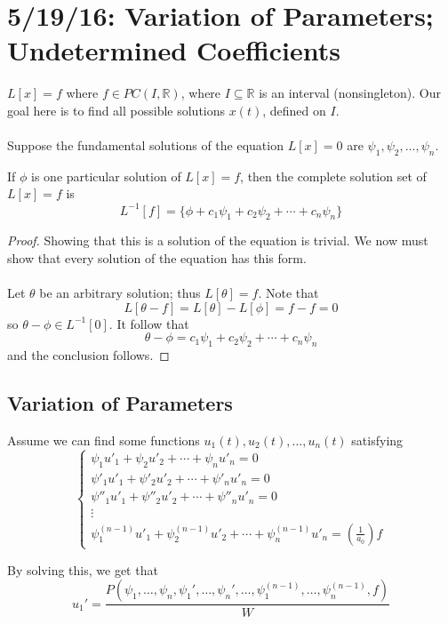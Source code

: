 \documentclass[12pt]{article}
\begin{document}
\section{5/19/16: Variation of Parameters; Undetermined Coefficients}

$L[x] = f$ where $f \in PC(I,\mathbb{R})$, where $I \subseteq \mathbb{R}$ is an interval (nonsingleton). Our goal here is to find all possible solutions $x(t)$, defined on $I$. \\ \\
Suppose the fundamental solutions of the equation $L[x] = 0$ are $\psi_1,\psi_2,\dots,\psi_n$.

\begin{theorem}
If $\phi$ is one particular solution of $L[x] = f$, then the complete solution set of $L[x] = f$ is \[ L^{-1}[f] = \{ \phi + c_1\psi_1 + c_2\psi_2 + \cdots + c_n\psi_n \} \]
\end{theorem}

\begin{proof}
Showing that this is a solution of the equation is trivial. We now must show that every solution of the equation has this form.\\ \\
Let $\theta$ be an arbitrary solution; thus $L[\theta] = f$. Note that \[ L[\theta - f] = L[\theta] - L[\phi] = f - f = 0 \] so $\theta - \phi \in L^{-1}[0]$. It follow that \[ \theta - \phi = c_1\psi_1 + c_2\psi_2 + \cdots + c_n\psi_n \] and the conclusion follows.
\end{proof}

\subsection{Variation of Parameters}
Assume we can find some functions $u_1(t),u_2(t),\dots,u_n(t)$ satisfying 
\[
\begin{cases}
  \psi_1u'_1 + \psi_2u'_2 + \cdots + \psi_nu'_n = 0 \\
  \psi'_1u'_1 + \psi'_2u'_2 + \cdots + \psi'_nu'_n = 0 \\
  \psi''_1u'_1 + \psi''_2u'_2 + \cdots + \psi''_nu'_n = 0 \\
  \vdots \\
  \psi^{(n-1)}_1u'_1 + \psi^{(n-1)}_2u'_2 + \cdots + \psi^{(n-1)}_nu'_n = \left(\frac{1}{a_0}\right)f
\end{cases}
\]

By solving this, we get that \[ u_1' = \frac{P(\psi_1,\dots,\psi_n,\psi_1',\dots,\psi_n',\dots,\psi_1^{(n-1)},\dots,\psi_n^{(n-1)},f)}{W} \]
\end{document}
